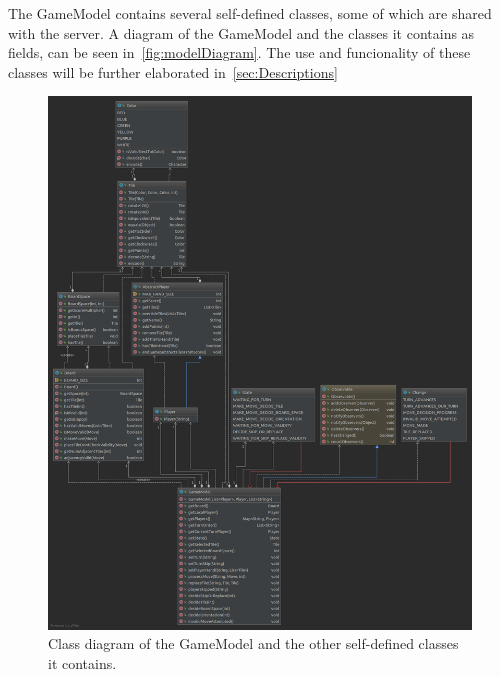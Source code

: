 \documentclass[12pt, letterpaper]{article}
\begin{document}
    The GameModel contains several self-defined classes, some of which are shared with the server.
    A diagram of the GameModel and the classes it contains as fields, can be seen in~\autoref{fig:modelDiagram}.
    The use and funcionality of these classes will be further elaborated in~\autoref{sec:Descriptions}



    \begin{figure}[ht]
        \begin{center}
            \includegraphics[width=\textwidth]{GameModel.png}
            \caption{Class diagram of the GameModel and the other self-defined classes it contains.}
            \label{fig:modelDiagram}
        \end{center}
    \end{figure}
\end{document}
